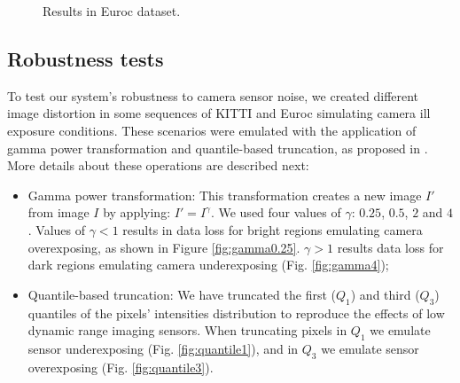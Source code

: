 \begin{figure}
\centering
{}
\qquad
{}

\qquad
{}


\caption{Results in Euroc dataset.}
\label{fig:all-traj-euroc}
\end{figure}

\subsection{Robustness tests}

To test our system's robustness to camera sensor noise, we created different image distortion in some sequences of KITTI and Euroc simulating camera ill exposure conditions. These scenarios were emulated with the application of gamma power transformation and quantile-based truncation, as proposed in \cite{emulate-exposure}. More details about these operations are described next:

\begin{itemize}
    \item Gamma power transformation: This transformation creates a new image $I' $ from image $I$ by applying: $I' =I^{\gamma}$. We used four values of $\gamma$: $0.25$, $0.5$, $2$ and $4$. Values of $\gamma < 1$ results in data loss for bright regions emulating camera overexposing, as shown in Figure \ref{fig:gamma0.25}. $\gamma > 1$ results data loss for dark regions emulating camera underexposing \cite{emulate-exposure} (Fig. \ref{fig:gamma4});
    
    \item Quantile-based truncation: We have truncated the first ($Q_1$) and third ($Q_3$) quantiles of the pixels' intensities distribution to reproduce the effects of low dynamic range imaging sensors. When truncating pixels in $Q_1$ we emulate sensor underexposing (Fig. \ref{fig:quantile1}), and in $Q_3$ we emulate sensor overexposing (Fig. \ref{fig:quantile3}).
\end{itemize}

